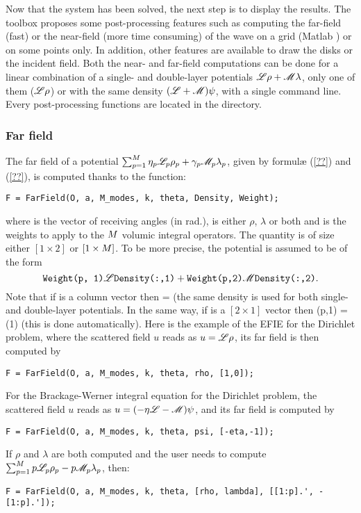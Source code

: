 Now that the system has been solved, the next step is to display the results. The \mudiff toolbox proposes some post-processing features such as computing the far-field (fast) or the near-field (more time consuming) of the wave on a grid (Matlab ) or on some points only. In addition, other features are available to draw the disks or the incident field. Both the near- and far-field computations can be done for a linear combination of a single- and double-layer potentials ${\mathscr L}\rho + {\mathscr M}\lambda$, only one of them (\eg ${\mathscr L}\rho$) or with the same density $({\mathscr L}+{\mathscr M})\psi$, with a single command line. Every post-processing functions are located in the  directory.

\subsubsection{Far field}

The far field of a potential $\sum_{p=1}^{M}\eta_p{\mathscr L}_p\rho_p + \gamma_p{\mathscr M}_p\lambda_p$, given by formul\ae{} (\ref{??}) and (\ref{??}), is computed thanks to the  function:
\begin{verbatim}
F = FarField(O, a, M_modes, k, theta, Density, Weight);
\end{verbatim}
where  is the vector of receiving angles (in rad.),  is either $\rho$, $\lambda$ or both and  is the weights to apply to the $M$ volumic integral operators. The quantity  is of size either $[1\times2]$ or $[1\times M]$. To be more precise, the potential is assumed to be of the form
$$
\texttt{Weight(p, 1)}{\mathscr L}\texttt{Density(:,1)} + \texttt{Weight(p,2)}{\mathscr M}\texttt{Density(:,2)}.
$$
Note that if  is a column vector then  =  (the same density is used for both single- and double-layer potentials. In the same way, if  is a $[2\times1]$ vector then (p,1) = (1) (this is done automatically). Here is the example of the EFIE for the Dirichlet problem, where the scattered field $u$ reads as $u = {\mathscr L}\rho$, its far field is then computed by
\begin{verbatim}
F = FarField(O, a, M_modes, k, theta, rho, [1,0]);
\end{verbatim}
For the Brackage-Werner integral equation for the Dirichlet problem,  the scattered field $u$ reads as $u = (-\eta{\mathscr L}-{\mathscr M})\psi$, and its far field is computed by
\begin{verbatim}
F = FarField(O, a, M_modes, k, theta, psi, [-eta,-1]);
\end{verbatim}
If $\rho$ and $\lambda$ are both computed and the user needs to compute $\sum_{p=1}^{M} p{\mathscr L}_p\rho_p - p{\mathscr M}_p\lambda_p$, then: 
\begin{verbatim}
F = FarField(O, a, M_modes, k, theta, [rho, lambda], [[1:p].', -[1:p].']);
\end{verbatim}

